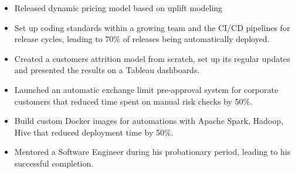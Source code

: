 \begin{itemize}
    \item Released dynamic pricing model based on uplift modeling
    \item Set up coding standards within a growing team and the CI/CD pipelines for release cycles, leading to 70\% of releases being automatically deployed.
    \item Created a customers attrition model from scratch, set up its regular updates and presented the results on a Tableau dashboards.
    \item Launched an automatic exchange limit pre-approval system for corporate customers that reduced time spent on manual risk checks by 50\%.
    \item Build custom Docker images for automations with Apache Spark, Hadoop, Hive that reduced deployment time by 50\%.
    \item Mentored a Software Engineer during his probationary period, leading to his successful completion.
\end{itemize}
